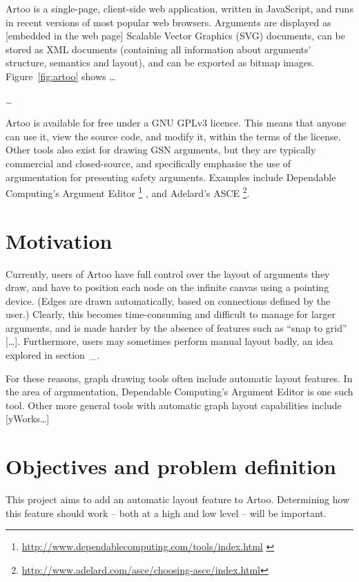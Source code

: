 Artoo is a single-page, client-side web application, written in JavaScript, and runs in recent versions of most popular web browsers.
Arguments are displayed as [embedded in the web page] Scalable Vector Graphics (SVG) documents, can be stored as XML documents (containing all information about arguments' structure, semantics  and layout), and can be exported as bitmap images.
Figure~\ref{fig:artoo} shows \ldots

\ldots

Artoo is available for free under a GNU GPLv3 licence.
This means that anyone can use it, view the source code, and modify it, within the terms of the license.
Other tools also exist for drawing GSN arguments, but they are typically commercial and closed-source,  and specifically emphasise the use of argumentation for presenting safety arguments.
Examples include Dependable Computing's Argument Editor
\footnote{\url{http://www.dependablecomputing.com/tools/index.html} \label{fn:depcomp}}
, and Adelard's ASCE 
\footnote{\url{http://www.adelard.com/asce/choosing-asce/index.html}}.


\section{Motivation}

Currently, users of Artoo have full control over the layout of arguments they draw, and have to position each node on the infinite canvas using a pointing device.
(Edges are drawn automatically, based on connections defined by the user.)
Clearly, this becomes time-consuming and difficult to manage for larger arguments, and is made harder by the absence of features such as ``snap to grid'' [\ldots].
Furthermore, users may sometimes perform manual layout badly, an idea explored in section~\_.

For these reasons, graph drawing tools often include automatic layout features.
In the area of argumentation, Dependable Computing's Argument Editor is one such tool. 
Other more general tools with automatic graph layout capabilities include [yWorks\ldots]


\section{Objectives and problem definition}

This project aims to add an automatic layout feature to Artoo.
Determining how this feature should work -- both at a high and low level -- will be important.

